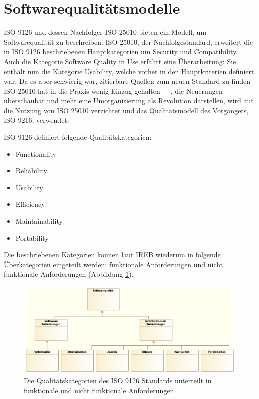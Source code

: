 \section{Softwarequalitätsmodelle}
ISO 9126 \cite{ISO_SQ} und dessen Nachfolger ISO 25010 \cite{ISO_SQ2} bieten ein Modell, um Softwarequalität zu beschreiben. ISO 25010, der Nachfolgestandard, erweitert die in ISO 9126 beschriebenen Hauptkategorien um Security und Compatibility. Auch die Kategorie Software Quality in Use erfährt eine Überarbeitung: Sie enthält nun die Kategorie Usability, welche vorher in den Hauptkriterien definiert war. Da es aber schwierig war, zitierbare Quellen zum neuen Standard zu finden - ISO 25010 hat \glqq in die Praxis wenig Einzug gehalten\grqq \ \cite[S. 60]{effektiv} - , die Neuerungen überschaubar und mehr eine Umorganisierung als Revolution darstellen, wird auf die Nutzung von ISO 25010 verzichtet und das Qualitätsmodell des Vorgängers, ISO 9216, verwendet.

ISO 9126 definiert folgende Qualitätskategorien:

\begin{itemize}
  \item \glqq Functionality\grqq
  \item \glqq Reliability\grqq
  \item \glqq Usability\grqq
  \item \glqq Efficiency\grqq
  \item \glqq Maintainability\grqq
  \item \glqq Portability\grqq
\end{itemize}


Die beschriebenen Kategorien können laut IREB wiederum in folgende Überkategorien eingeteilt werden: funktionale Anforderungen und nicht funktionale Anforderungen (Abbildung \ref{fig:iso9126}).

\begin{figure}[H]
    \centering
    \includegraphics[scale=0.48]{img/iso9126.png}
    \caption{Die Qualitätskategorien des ISO 9126 Standards unterteilt in funktionale und nicht funktionale Anforderungen}
    \label{fig:iso9126}
\end{figure}


